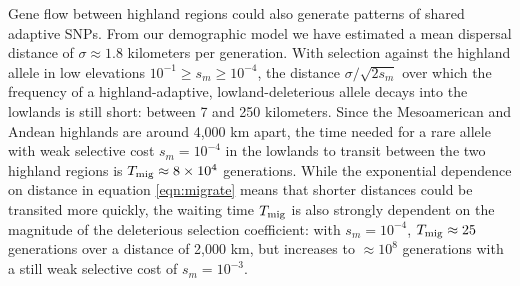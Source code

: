 
Gene flow between highland regions could also generate patterns of shared adaptive SNPs.
From our demographic model we have estimated a mean dispersal distance of $\sigma \approx 1.8$ kilometers per generation.
With selection against the highland allele in low elevations $10^{-1} \ge s_m \ge 10^{-4}$, 
the distance $\sigma/\sqrt{2s_m}$ over which the frequency of a highland-adaptive, lowland-deleterious allele decays into the lowlands is still short: 
between 7 and 250 kilometers.
Since the Mesoamerican and Andean highlands are around 4,000 km apart, the time needed for a rare allele with weak selective cost $s_m=10^{-4}$ in the lowlands 
to transit between the two highland regions is $T_{\text{mig}} \approx 8 \times 10^{4}$ generations. 
While the exponential dependence on distance in equation \eqref{eqn:migrate} means that shorter distances could be transited more quickly, the waiting time $T_{\text{mig}}$ is also strongly dependent on the magnitude of the deleterious selection coefficient: with $s_m=10^{-4}$, $T_{\text{mig}} \approx 25$ generations over a distance of 2,000 km, but increases to $\approx 10^{8}$ generations with a still weak selective cost of $s_m=10^{-3}$.


